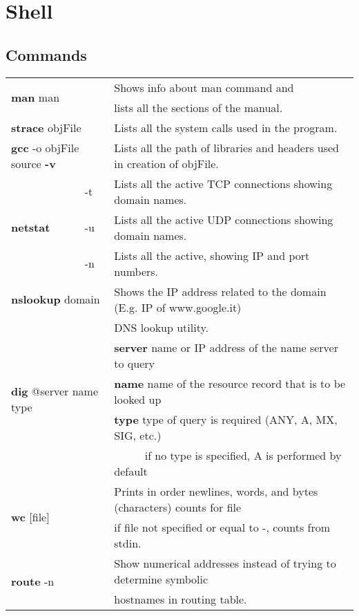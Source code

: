 \chapter{Shell}

\section{Commands}

\begin{table}[h]
\centering
\footnotesize
\begin{tabular}{|l|l|l|}
\hline
\multicolumn{2}{|l|}{\multirow{2}{*}{\textbf{man} man}}&{Shows info about man command and}\\
\multicolumn{2}{|l|}{} & {lists all the sections of the manual.}\\
\hline
\multicolumn{2}{|l|}{\textbf{strace} objFile} & {Lists all the system calls used in the program.}\\
\hline
\multicolumn{2}{|l|}{\textbf{gcc} -o objFile source \textbf{-v}} & {Lists all the path of libraries and headers used in creation of objFile.}\\
\hline
\multirow{3}{*}{\textbf{netstat}} & {-t} & {Lists all the active TCP connections showing domain names.}\\
\cline{2-3}
& {-u} & {Lists all the active UDP connections showing domain names.}\\
\cline{2-3}
& {-n} & {Lists all the active, showing IP and port numbers.}\\
\hline
\multicolumn{2}{|l|}{\textbf{nslookup} domain} & {Shows the IP address related to the domain (E.g. IP of www.google.it)}\\
\hline
\multicolumn{2}{|l|}{\multirow{5}{*}{\textbf{dig} @server name type}}&{DNS lookup utility.}\\
\multicolumn{2}{|l|}{}&{\textbf{server} name or IP address of the name server to query}\\
\multicolumn{2}{|l|}{}&{\textbf{name} name of the resource record that is to be looked up}\\
\multicolumn{2}{|l|}{}&{\textbf{type} type of query is required (ANY, A, MX, SIG, etc.)}\\
\multicolumn{2}{|l|}{}&{$\;\;\;\;\;\;\;\;\;\;$if no type is specified, A is performed by default}\\
\hline
\multicolumn{2}{|l|}{\multirow{2}{*}{\textbf{wc} [file]}} & {Prints in order newlines, words, and bytes (characters) counts for file}\\
\multicolumn{2}{|l|}{} & {if file not specified or equal to -, counts from stdin.}\\
\hline
\multicolumn{2}{|l|}{\multirow{2}{*}{\textbf{route} -n}} & {Show numerical addresses instead of trying to determine symbolic}\\
\multicolumn{2}{|l|}{} & {hostnames in routing table.}\\
\hline
\end{tabular}
\end{table}


